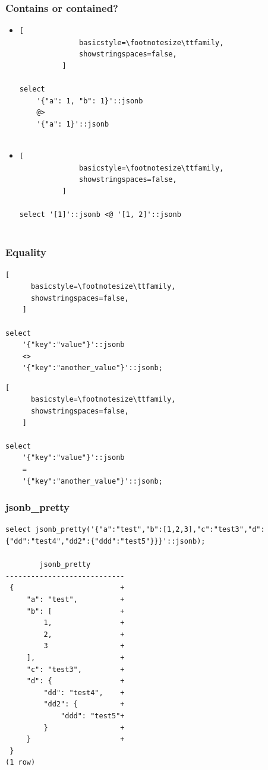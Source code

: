 \documentclass[14pt, compress]{beamer}
\begin{document}
\begin{frame}[fragile]
  \frametitle{Contains or contained?}

  \begin{itemize}
      \item
          \begin{lstlisting}[
              basicstyle=\footnotesize\ttfamily,
              showstringspaces=false,
          ]

select
    '{"a": 1, "b": 1}'::jsonb
    @>
    '{"a": 1}'::jsonb
         
          \end{lstlisting}

      \item
          \begin{lstlisting}[
              basicstyle=\footnotesize\ttfamily,
              showstringspaces=false,
          ]

select '[1]'::jsonb <@ '[1, 2]'::jsonb
         
          \end{lstlisting}


  \end{itemize}

\end{frame}

\begin{frame}[fragile]
  \frametitle{Equality}

    \begin{lstlisting}[
      basicstyle=\footnotesize\ttfamily,
      showstringspaces=false,
    ]

select
    '{"key":"value"}'::jsonb
    <>
    '{"key":"another_value"}'::jsonb;

    \end{lstlisting}

    \begin{lstlisting}[
      basicstyle=\footnotesize\ttfamily,
      showstringspaces=false,
    ]

select
    '{"key":"value"}'::jsonb
    =
    '{"key":"another_value"}'::jsonb;

    \end{lstlisting}

\end{frame}

\begin{frame}[fragile]
  \frametitle{jsonb\_pretty}

  \begin{lstlisting}[]
select jsonb_pretty('{"a":"test","b":[1,2,3],"c":"test3","d":{"dd":"test4","dd2":{"ddd":"test5"}}}'::jsonb);

        jsonb_pretty        
----------------------------
 {                         +
     "a": "test",          +
     "b": [                +
         1,                +
         2,                +
         3                 +
     ],                    +
     "c": "test3",         +
     "d": {                +
         "dd": "test4",    +
         "dd2": {          +
             "ddd": "test5"+
         }                 +
     }                     +
 }
(1 row)
  \end{lstlisting}

\end{frame}
\end{document}
